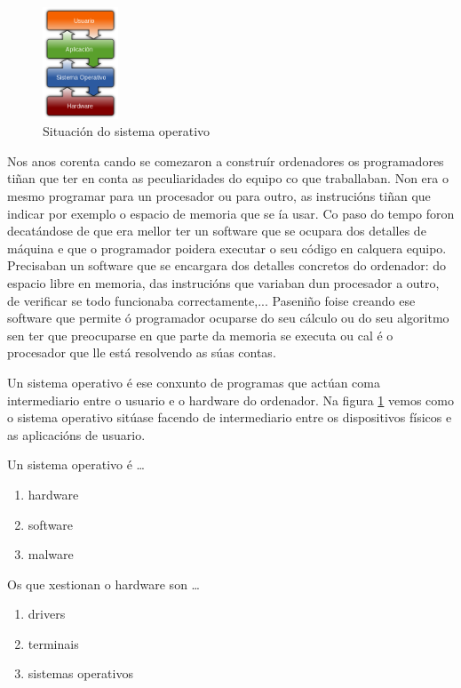 \begin{figure}
	\begin{center}
	\includegraphics[width=0.2\textwidth]{./debuxos/capas.png}
	 \caption{Situación do sistema operativo}
	 \end{center}
	 \label{capas}
\end{figure}

\begin{doublespace}
Nos anos corenta cando se comezaron a construír ordenadores os programadores tiñan que ter en conta as peculiaridades do equipo co que traballaban. Non era o mesmo programar para un procesador ou para outro, as instrucións tiñan que indicar por exemplo o espacio de memoria que se ía usar. Co paso do tempo foron decatándose de que era mellor ter un software que se ocupara dos detalles de máquina e que o programador poidera executar o seu código en calquera equipo. Precisaban un software que se encargara dos detalles concretos do ordenador: do espacio libre en memoria, das instrucións que variaban dun procesador a outro, de verificar se todo funcionaba correctamente,... Paseniño foise creando ese software que permite ó programador ocuparse do seu cálculo ou do seu algoritmo sen ter que preocuparse en que parte da memoria se executa ou cal é o procesador que lle está resolvendo as súas contas. 

Un sistema operativo é ese conxunto de programas que actúan coma intermediario entre o usuario e o hardware do ordenador. Na figura \ref{capas} vemos como o sistema operativo sitúase facendo de intermediario entre os dispositivos físicos e as aplicacións de usuario.\\
\end{doublespace}

\begin{diapo} \begin{frame}{Un sistema operativo é  \dots} 
\begin{enumerate}
\item hardware\pause
\item software \pause
\item malware 
\end{enumerate}
\end{frame} 
\end{diapo} 
\begin{diapo}\begin{frame}{Os que xestionan o hardware son  \dots}
\begin{enumerate}
\item drivers \pause
\item terminais \pause
\item sistemas operativos
\end{enumerate}
\end{frame}
\end{diapo}


